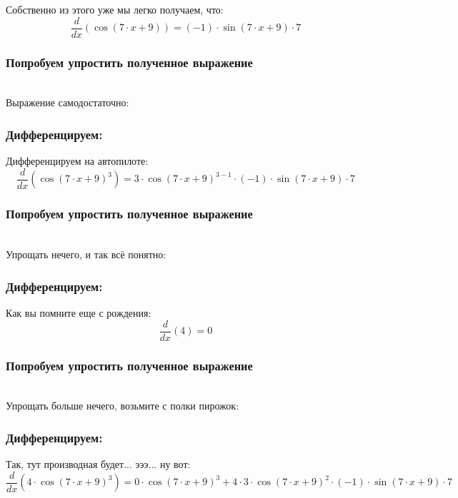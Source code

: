 \documentclass[a4paper,12pt]{article}
\begin{document}
Собственно из этого уже мы легко получаем, что:
\begin{dmath}\frac{d}{dx}\left(\operatorname{cos}\left(7\cdot x+ 9\right) \right)=(-1)\cdot \operatorname{sin}\left(7\cdot x+ 9\right) \cdot 7\end{dmath}
\subsubsection*{Попробуем упростить полученное выражение}
\\Выражение самодостаточно:

\subsubsection*{Дифференцируем:}

Дифференцируем на автопилоте:
\begin{dmath}\frac{d}{dx}\left(\operatorname{cos}\left(7\cdot x+ 9\right) ^{3}\right)=3\cdot \operatorname{cos}\left(7\cdot x+ 9\right) ^{3- 1}\cdot (-1)\cdot \operatorname{sin}\left(7\cdot x+ 9\right) \cdot 7\end{dmath}
\subsubsection*{Попробуем упростить полученное выражение}
\\Упрощать нечего, и так всё понятно:

\subsubsection*{Дифференцируем:}

Как вы помните еще с рождения:
\begin{dmath}\frac{d}{dx}\left(4\right)=0\end{dmath}
\subsubsection*{Попробуем упростить полученное выражение}
\\Упрощать больше нечего, возьмите с полки пирожок:

\subsubsection*{Дифференцируем:}

Так, тут производная будет... эээ... ну вот:
\begin{dmath}\frac{d}{dx}\left(4\cdot \operatorname{cos}\left(7\cdot x+ 9\right) ^{3}\right)=0\cdot \operatorname{cos}\left(7\cdot x+ 9\right) ^{3}+ 4\cdot 3\cdot \operatorname{cos}\left(7\cdot x+ 9\right) ^{2}\cdot (-1)\cdot \operatorname{sin}\left(7\cdot x+ 9\right) \cdot 7\end{dmath}
\end{document}
